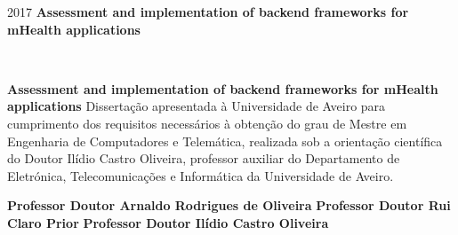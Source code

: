 \documentclass[11pt,twoside,a4paper]{report}
\def\ThesisYear{2017}
\begin{document}
%
%

\TitlePage
  \HEADER{\BAR\FIG{}}
         {\ThesisYear}
      \TITLE{}{}
      \TITLE{}{}
  \TITLE{}
        {\textbf{\textsf{Assessment and implementation of backend frameworks for mHealth applications}}}

\EndTitlePage
\titlepage\ \endtitlepage %


%
%

\TitlePage
  \HEADER{}{\ThesisYear}
      \TITLE{}{}
      \TITLE{}{}
  \TITLE{}
        {\textsf{\textbf{Assessment and implementation of backend frameworks for mHealth applications}}}
  \vspace*{15mm}
  \TEXT{}
       {Disserta\c c\~ao apresentada \`a Universidade de Aveiro para cumprimento dos requisitos necess\'arios \`a obten\c c\~ao do
        grau de Mestre em Engenharia de Computadores e Telem\'atica, realizada sob a orienta\c c\~ao cient\'ifica do Doutor Il\'idio Castro Oliveira, professor auxiliar do Departamento de Eletr\'onica, Telecomunica\c c\~oes e Inform\'atica da Universidade de Aveiro.}
\EndTitlePage
\titlepage\ \endtitlepage %


\TitlePage
  \vspace*{55mm}
       {}
       {\textbf{Professor Doutor Arnaldo Rodrigues de Oliveira}}
  \vspace*{5mm}
       {\textbf{Professor Doutor Rui Claro Prior}}
  \vspace*{5mm}
  \TEXT{}
       {\textbf{Professor Doutor Ilídio Castro Oliveira}}
\EndTitlePage
\titlepage\ \endtitlepage %
\end{document}
